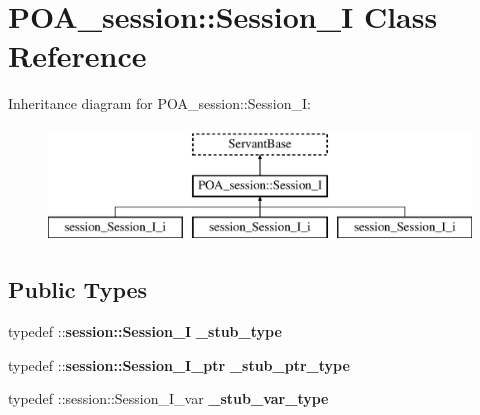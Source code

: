 \section{P\+O\+A\+\_\+session\+:\+:Session\+\_\+I Class Reference}
\label{classPOA__session_1_1Session__I}
Inheritance diagram for P\+O\+A\+\_\+session\+:\+:Session\+\_\+I\+:\begin{figure}[H]
\begin{center}
\leavevmode
\includegraphics[height=3.000000cm]{classPOA__session_1_1Session__I}
\end{center}
\end{figure}
\subsection*{Public Types}
\begin{DoxyCompactItemize}
\item 
typedef \+::{\bf session\+::\+Session\+\_\+I} {\bfseries \+\_\+stub\+\_\+type}\label{classPOA__session_1_1Session__I_a1b40ca9eeb77977b3bd0d8a5a3f6385b}

\item 
typedef \+::{\bf session\+::\+Session\+\_\+\+I\+\_\+ptr} {\bfseries \+\_\+stub\+\_\+ptr\+\_\+type}\label{classPOA__session_1_1Session__I_a1013e926be337aac87ee404772298546}

\item 
typedef \+::session\+::\+Session\+\_\+\+I\+\_\+var {\bfseries \+\_\+stub\+\_\+var\+\_\+type}\label{classPOA__session_1_1Session__I_af2fe35f95e22ffd73828470c8d6b32db}

\end{DoxyCompactItemize}

